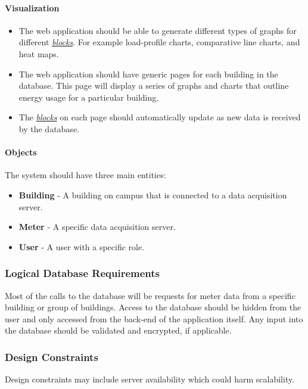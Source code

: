     \paragraph{Visualization}
    \begin{itemize}
        \setlength\itemsep{1mm}
        \item The web application should be able to generate different types of graphs for different \hyperref[definition]{\textit{blocks}}. For example load-profile charts, comparative line charts, and heat maps.
        \item The web application should have generic pages for each building in the database. This page will display a series of graphs and charts that outline energy usage for a particular building.
        \item The \hyperref[definition]{\textit{blocks}} on each page should automatically update as new data is received by the database.
    \end{itemize}
    \paragraph{Objects}
        The system should have three main entities: 
        \begin{itemize}
            \setlength\itemsep{1mm}
            \item \textbf{Building} - A building on campus that is connected to a data acquisition server.
            \item \textbf{Meter} - A specific data acquisition server.
            \item \textbf{User} - A user with a specific role.
        \end{itemize}
        
    \subsubsection{Logical Database Requirements}
    Most of the calls to the database will be requests for meter data from a specific building or group of buildings. Access to the database should be hidden from the user and only accessed from the back-end of the application itself. Any input into the database should be validated and encrypted, if applicable. 
    
    \subsubsection{Design Constraints}
    Design constraints may include server availability which could harm scalability.
